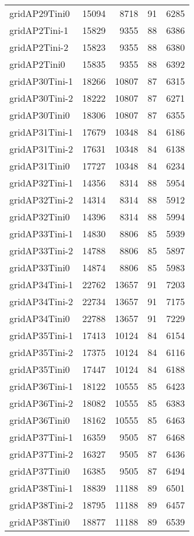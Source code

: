 \begin{longtable}{lrrrr}
gridAP29Tini0 & 15094 & 8718 & 91 & 6285 \\
gridAP2Tini-1 & 15829 & 9355 & 88 & 6386 \\
gridAP2Tini-2 & 15823 & 9355 & 88 & 6380 \\
gridAP2Tini0 & 15835 & 9355 & 88 & 6392 \\
gridAP30Tini-1 & 18266 & 10807 & 87 & 6315 \\
gridAP30Tini-2 & 18222 & 10807 & 87 & 6271 \\
gridAP30Tini0 & 18306 & 10807 & 87 & 6355 \\
gridAP31Tini-1 & 17679 & 10348 & 84 & 6186 \\
gridAP31Tini-2 & 17631 & 10348 & 84 & 6138 \\
gridAP31Tini0 & 17727 & 10348 & 84 & 6234 \\
gridAP32Tini-1 & 14356 & 8314 & 88 & 5954 \\
gridAP32Tini-2 & 14314 & 8314 & 88 & 5912 \\
gridAP32Tini0 & 14396 & 8314 & 88 & 5994 \\
gridAP33Tini-1 & 14830 & 8806 & 85 & 5939 \\
gridAP33Tini-2 & 14788 & 8806 & 85 & 5897 \\
gridAP33Tini0 & 14874 & 8806 & 85 & 5983 \\
gridAP34Tini-1 & 22762 & 13657 & 91 & 7203 \\
gridAP34Tini-2 & 22734 & 13657 & 91 & 7175 \\
gridAP34Tini0 & 22788 & 13657 & 91 & 7229 \\
gridAP35Tini-1 & 17413 & 10124 & 84 & 6154 \\
gridAP35Tini-2 & 17375 & 10124 & 84 & 6116 \\
gridAP35Tini0 & 17447 & 10124 & 84 & 6188 \\
gridAP36Tini-1 & 18122 & 10555 & 85 & 6423 \\
gridAP36Tini-2 & 18082 & 10555 & 85 & 6383 \\
gridAP36Tini0 & 18162 & 10555 & 85 & 6463 \\
gridAP37Tini-1 & 16359 & 9505 & 87 & 6468 \\
gridAP37Tini-2 & 16327 & 9505 & 87 & 6436 \\
gridAP37Tini0 & 16385 & 9505 & 87 & 6494 \\
gridAP38Tini-1 & 18839 & 11188 & 89 & 6501 \\
gridAP38Tini-2 & 18795 & 11188 & 89 & 6457 \\
gridAP38Tini0 & 18877 & 11188 & 89 & 6539 \\

\end{longtable}
